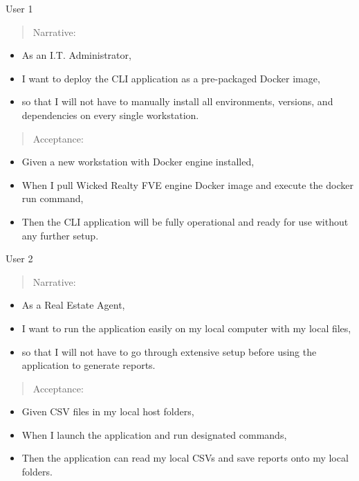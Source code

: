 \documentclass[
]{article}
\begin{document}
User 1

\begin{quote}
Narrative:
\end{quote}

\begin{itemize}
\item
  As an I.T. Administrator,
\item
  I want to deploy the CLI application as a pre-packaged Docker image,
\item
  so that I will not have to manually install all environments,
  versions, and dependencies on every single workstation.
\end{itemize}

\begin{quote}
Acceptance:
\end{quote}

\begin{itemize}
\item
  Given a new workstation with Docker engine installed,
\item
  When I pull Wicked Realty FVE engine Docker image and execute the
  docker run command,
\item
  Then the CLI application will be fully operational and ready for use
  without any further setup.
\end{itemize}

User 2

\begin{quote}
Narrative:
\end{quote}

\begin{itemize}
\item
  As a Real Estate Agent,
\item
  I want to run the application easily on my local computer with my
  local files,
\item
  so that I will not have to go through extensive setup before using the
  application to generate reports.
\end{itemize}

\begin{quote}
Acceptance:
\end{quote}

\begin{itemize}
\item
  Given CSV files in my local host folders,
\item
  When I launch the application and run designated commands,
\item
  Then the application can read my local CSVs and save reports onto my
  local folders.
\end{itemize}
\end{document}
